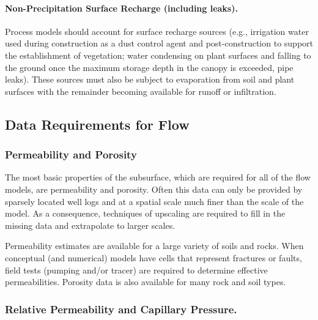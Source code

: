 \paragraph{Non-Precipitation Surface Recharge (including leaks).} 
Process models should account for surface recharge sources (e.g., irrigation water used
during construction as a dust control agent and post-construction to
support the establishment of vegetation; water condensing on plant
surfaces and falling to the ground once the maximum storage depth in
the canopy is exceeded, pipe leaks).  
These sources must also be subject to evaporation from soil and plant surfaces with the remainder
becoming available for runoff or infiltration.





%
%

\subsection{Data Requirements for Flow}

\subsubsection{Permeability and Porosity}

The most basic properties of the subsurface, which are required for
all of the flow models, are permeability and porosity.  Often this
data can only be provided by sparsely located well logs and at a
spatial scale much finer than the scale of the model. As a
consequence, techniques of upscaling are required to fill in the
missing data and extrapolate to larger scales.

Permeability estimates are available for a large variety of soils and
rocks. When conceptual (and numerical) models have cells that
represent fractures or faults, field tests (pumping and/or tracer) are
required to determine effective permeabilities. Porosity data is also
available for many rock and soil types.

\subsubsection{Relative Permeability and Capillary Pressure.}

